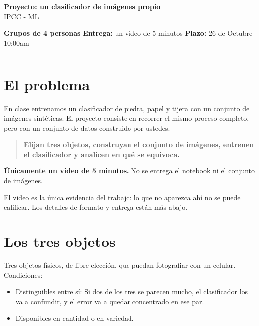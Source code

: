 \documentclass[11pt,a4paper]{article}
\begin{document}
\begin{center}
{\LARGE\bfseries Proyecto: un clasificador de imágenes propio}\\[4pt]
{\Large IPCC - ML}
\end{center}


\noindent\textbf{Grupos de 4 personas} \hfill
\textbf{Entrega:} un video de 5 minutos \hfill
\textbf{Plazo:} 26 de Octubre 10:00am

\vspace{0.5cm}
\hrule
\vspace{1cm}

\section{El problema}

En clase entrenamos un clasificador de piedra, papel y tijera con un conjunto de imágenes sintéticas. El proyecto consiste en recorrer el
mismo proceso completo, pero con un conjunto de datos construido por ustedes.

\begin{quote}
\textbf{Elijan tres objetos,  construyan el conjunto de imágenes, entrenen el clasificador y analicen en qué se equivoca.}
\end{quote}

\begin{tcolorbox}[colback=red!4,colframe=red!45,boxrule=0.7pt,title=\textbf{Qué se entrega}]
\textbf{Únicamente un video de 5 minutos.} No se entrega el notebook ni el conjunto de imágenes.

El video es la única evidencia del trabajo: lo que no aparezca ahí no se puede calificar.
Los detalles de formato y entrega están más abajo.
\end{tcolorbox}

\vspace{1cm}

\section{Los tres objetos}

Tres objetos físicos, de libre elección, que puedan fotografiar con un celular. Condiciones:

\begin{itemize}
  \item {Distinguibles entre sí: } Si dos de los tres se parecen mucho, el clasificador los va a confundir, y el error va a quedar concentrado en ese par.
  \item {Disponibles en cantidad o en variedad.} 
\end{itemize}
\end{document}
